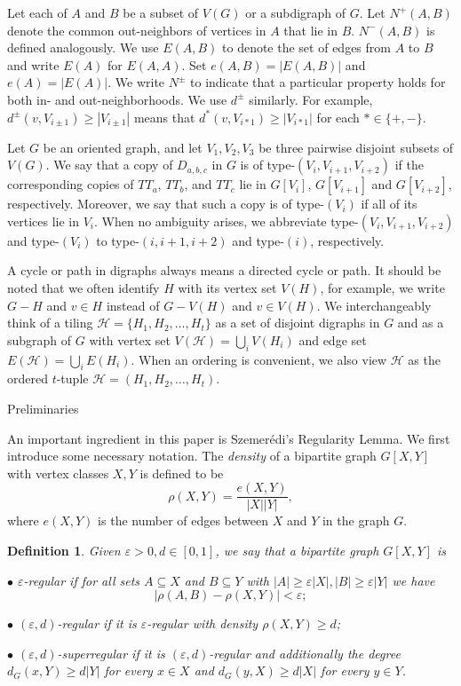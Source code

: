 \documentclass[11pt,a4paper,reqno]{amsart}
\makeatletter
\renewcommand\section{\@startsection{section}{1}%
  \z@{-1.0\linespacing\@plus-.7\linespacing}{1\linespacing}%
  {\normalfont\bfseries\large\centering}}
\newtheorem{definition}{Definition}
\theoremstyle{definition} %
\makeatother
\begin{document}
Let each of $A$ and $B$ be a subset of $V(G)$ or a subdigraph of $G$. Let $N^+(A,B)$ denote the common out-neighbors of  vertices in $A$ that lie in $B$. $N^-(A,B)$ is defined analogously.   We use $E(A,B)$ to denote the set of edges from $A$ to $B$ and write $E(A)$ for $E(A,A)$. Set $e(A,B) = |E(A,B)|$ and $e(A) = |E(A)|$.  We write $N^{\pm}$ to indicate that a particular property holds for both in- and out-neighborhoods. We use $d^{\pm}$ similarly. For example, $d^{\pm}(v,V_{i\pm 1})\geqslant |V_{i\pm 1}|$ means that $d^{\ast}(v,V_{i\ast 1})\geqslant |V_{i\ast 1}|$ for each $\ast\in\{+,-\}$. 

Let $G$ be an oriented graph, and let $V_1,V_2,V_3$ be three pairwise disjoint subsets of $V(G)$. We say that a copy of $D_{a,b,c}$ in $G$ is of type-$(V_i,V_{i+1},V_{i+2})$ if the corresponding copies of $TT_a$, $TT_b$, and $TT_c$ lie in $G[V_i]$, $G[V_{i+1}]$ and $G[V_{i+2}]$, respectively. Moreover, we say that such a copy is of type-$(V_i)$ if all of its vertices lie in $V_i$. When no ambiguity arises, we abbreviate type-$(V_i,V_{i+1},V_{i+2})$ and type-$(V_i)$ to type-$(i,i+1,i+2)$ and type-$(i)$, respectively.


A cycle or path in digraphs always means a directed cycle or path.  It should be noted that we often identify $H$ with its vertex set $V(H)$, for example, we write $G-H$ and $v\in H$ instead of $G-V(H)$ and $v\in V(H)$.  We interchangeably think of a tiling $\mathcal{H}=\{H_1,H_2,\ldots,H_t\}$ as a set of disjoint  digraphs in $G$ and as a subgraph of $G$ with vertex set $V(\mathcal{H}) = \bigcup_{i} V(H_i)$ and edge set $E(\mathcal{H}) = \bigcup_{i} E(H_i)$. When an ordering is convenient, we also view $\mathcal{H}$ as the ordered $t$-tuple $\mathcal{H}=(H_1,H_2,\ldots,H_t)$.


\section{Preliminaries}\label{SEC-pre}

An important ingredient in this paper is Szemer\'{e}di's Regularity Lemma.  We first introduce some necessary notation. The \emph{density} of a bipartite graph $G[X,Y]$ with vertex classes $X,Y$ is defined to be $$\rho(X,Y)=\frac{e(X,Y)}{|X||Y|},$$ where $e(X,Y)$ is the number of edges between $X$ and $Y$ in the graph $G$. 
\begin{definition}
    Given $\varepsilon>0, d\in[0,1]$, we say that a bipartite graph $G[X,Y]$ is
	
	$\bullet$ \emph{$\varepsilon$-regular} if for all sets $A\subseteq X$ and $B\subseteq Y$ with $|A|\geqslant  \varepsilon|X|, |B|\geqslant  \varepsilon|Y|$ we have $$|\rho(A,B)-\rho(X,Y)|<\varepsilon;$$
	
	$\bullet$ \emph{$(\varepsilon,d)$-regular} if it is $\varepsilon$-regular with density $\rho(X,Y)\geqslant  d$;
	
	
	$\bullet$ \emph{$(\varepsilon,d)$-superregular} if it is $(\varepsilon,d)$-regular and additionally the degree $d_G(x,Y)\geqslant  d|Y|$ for every $x\in X$ and $d_G(y,X)\geqslant  d|X|$ for every $y\in Y$.
\end{definition}
\end{document}
